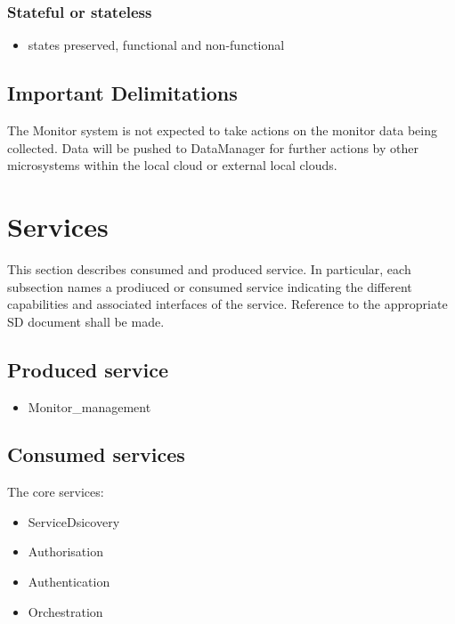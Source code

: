 \documentclass[a4paper]{arrowhead}
\begin{document}
\subsubsection {Stateful or stateless}
\begin{itemize} 
\item states preserved, functional and non-functional
\end{itemize}  


\subsection{Important Delimitations}
\label{sec:delimitations}

The Monitor system is not expected to take actions on the monitor data
being collected. Data will be pushed to DataManager for further
actions by other microsystems within the local cloud or external local clouds.



\section{Services}
\label{sec:services}

This section describes consumed and produced service.
In particular, each subsection names a prodiuced or consumed service
indicating the different capabilities and associated interfaces of the
service. Reference to the appropriate SD document shall be made.

\subsection{Produced service}

\begin{itemize}
\item Monitor\_management
\end{itemize}

\subsection{Consumed services}

The core services:
\begin{itemize}
\item ServiceDsicovery
\item Authorisation
\item Authentication
\item Orchestration
\end{itemize}
\end{document}

